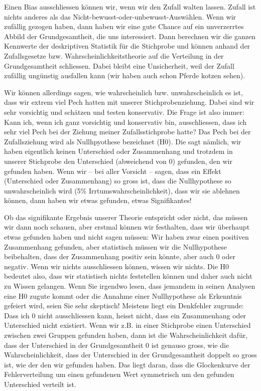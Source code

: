 \documentclass[
  10pt,
  letterpaper,
  a4paper, twoside]{scrreprt}
\begin{document}
Einen Bias ausschliessen können wir, wenn wir den Zufall walten lassen.
Zufall ist nichts anderes als das
Nicht-bewusst-oder-unbewusst-Auswählen. Wenn wir zufällig gezogen haben,
dann haben wir eine gute Chance auf ein unverzerrtes Abbild der
Grundgesamtheit, die uns interessiert. Dann berechnen wir die ganzen
Kennwerte der deskriptiven Statistik für die Stichprobe und können
anhand der Zufallsgesetze bzw. Wahrscheinlichkeitstheorie auf die
Verteilung in der Grundgesamtheit schliessen. Dabei bleibt eine
Unsicherheit, weil der Zufall zufällig ungünstig ausfallen kann (wir
haben auch schon Pferde kotzen sehen).

Wir können allerdings sagen, wie wahrscheinlich bzw. unwahrscheinlich es
ist, dass wir extrem viel Pech hatten mit unserer Stichprobenziehung.
Dabei sind wir sehr vorsichtig und schätzen und testen konservativ. Die
Frage ist also immer: Kann ich, wenn ich ganz vorsichtig und konservativ
bin, ausschliessen, dass ich sehr viel Pech bei der Ziehung meiner
Zufallsstichprobe hatte? Das Pech bei der Zufallsziehung wird als
Nullhpyothese bezeichnet (H0). Die sagt nämlich, wir haben eigentlich
keinen Unterschied oder Zusammenhang und trotzdem in unserer Stichprobe
den Unterschied (abweichend von 0) gefunden, den wir gefunden haben.
Wenn wir -- bei aller Vorsicht -- sagen, dass ein Effekt (Unterschied
oder Zusammenhang) so gross ist, dass die Nullhypothese so
unwahrscheinlich wird (5\% Irrtumswahrscheinlichkeit), dass wir sie
ablehnen können, dann haben wir etwas gefunden, etwas Signifikantes!

Ob das signifikante Ergebnis unserer Theorie entspricht oder nicht, das
müssen wir dann noch schauen, aber erstmal können wir festhalten, dass
wir überhaupt etwas gefunden haben und nicht sagen müssen: Wir haben
zwar einen positiven Zusammenhang gefunden, aber statistisch müssen wir
die Nullhypothese beibehalten, dass der Zusammenhang positiv sein
könnte, aber auch 0 oder negativ. Wenn wir nichts ausschliessen können,
wissen wir nichts. Die H0 bedeutet also, dass wir statistisch nichts
feststellen können und daher auch nicht zu Wissen gelangen. Wenn Sie
irgendwo lesen, dass jemandem in seinen Analysen eine H0 zugute kommt
oder die Annahme einer Nullhypothese als Erkenntnis gefeiert wird, seien
Sie sehr skeptisch! Meistens liegt ein Denkfehler zugrunde: Dass ich 0
nicht ausschliessen kann, heisst nicht, dass ein Zusammenhang oder
Unterschied nicht existiert. Wenn wir z.B. in einer Stichprobe einen
Unterschied zwischen zwei Gruppen gefunden haben, dann ist die
Wahrscheinlichkeit dafür, dass der Unterschied in der Grundgesamtheit 0
ist genauso gross, wie die Wahrscheinlichkeit, dass der Unterschied in
der Grundgesamtheit doppelt so gross ist, wie der den wir gefunden
haben. Das liegt daran, dass die Glockenkurve der Fehlerverteilung um
einen gefundenen Wert symmetrisch um den gefunden Unterschied verteilt
ist.
\end{document}
